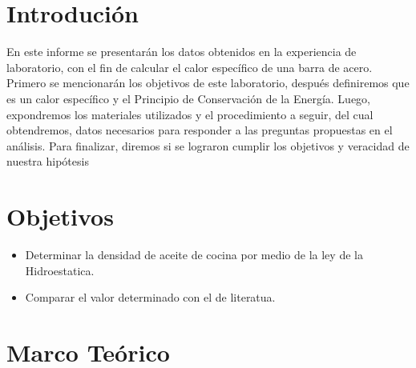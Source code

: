 \documentclass[a4paper, 12p]{article}
\begin{document}
\section{Introdución}
En este informe se presentarán los datos obtenidos en la experiencia de laboratorio, con el fin de calcular el calor específico de una barra de acero.
Primero se mencionarán los objetivos de este laboratorio, después definiremos que es un calor específico y el Principio de Conservación de la Energía. 
Luego, expondremos los materiales utilizados y el procedimiento a seguir, del cual obtendremos, datos necesarios para responder a las preguntas propuestas en el análisis.
Para finalizar, diremos si se lograron cumplir los objetivos y veracidad de nuestra hipótesis

\section{Objetivos}
\begin{itemize}
      \item Determinar la densidad de aceite de cocina por medio de la ley de la Hidroestatica.
      
      \item Comparar el valor determinado con el de literatua.
\end{itemize}



\section{Marco Teórico} 
\end{document}
